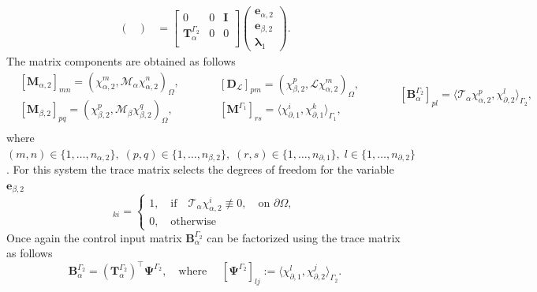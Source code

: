 \documentclass[11pt,a4paper]{article}
\newcommand{\innerproduct}[3][\Omega]{(#2, #3)_{#1}}
\newcommand{\boundary}[3][\partial\Omega]{\langle #2, #3\rangle_{#1}}
\begin{document}
{\begin{equation}
\begin{aligned}
\begin{pmatrix}
        \end{pmatrix} &= 
        \begin{bmatrix}
            0 & 0 & \mathbf{I} \\
            \mathbf{T}_\alpha^{\Gamma_2} & 0 & 0 \\
        \end{bmatrix}
        \begin{pmatrix}
            \mathbf{e}_{\alpha, 2} \\
            \mathbf{e}_{\beta, 2} \\
            \bm{\lambda}_1
        \end{pmatrix}.
\end{aligned}
\label{eq:systemL}
\end{equation}
The matrix components are obtained as follows
\begin{equation}
\begin{aligned}
&[\mathbf{M}_{\alpha, 2}]_{mn} = \innerproduct{\chi_{\alpha, 2}^m}{\mathcal{M}_\alpha \chi_{\alpha, 2}^n}, \\
&[\mathbf{M}_{\beta, 2}]_{pq} = \innerproduct{\chi_{\beta, 2}^p}{\mathcal{M}_\beta \chi_{\beta, 2}^q}, \\
\end{aligned}\qquad
\begin{aligned}
&[\mathbf{D}_\mathcal{L}]_{pm} = \innerproduct{\chi_{\beta, 2}^p}{\mathcal{L}\chi_{\alpha, 2}^m}, \\
&[\mathbf{M}^{\Gamma_1}]_{rs} = \boundary[\Gamma_1]{\chi_{\partial, 1}^i}{\chi_{\partial, 1}^k}, \\
\end{aligned}
\qquad
\begin{aligned}
&[\mathbf{B}_\alpha^{\Gamma_2}]_{pl} = \boundary[\Gamma_2]{\mathcal{T}_{\alpha}\chi_{\alpha, 2}^p}{\chi_{\partial, 2}^l}, \\
{}
\end{aligned}
\label{eq:Operational-matrices_2}
\end{equation}
where $(m,n) \in \{1, \dots, n_{\alpha, 2}\}, \; (p,q) \in\{1, \dots, n_{\beta, 2}\}, \; (r,s) \in \{1,\dots, n_{\partial, 1}\}, \; l \in \{1,\dots, n_{\partial, 2}\}$. For this system the trace matrix selects the degrees of freedom for the variable $\mathbf{e}_{\beta, 2}$
\begin{equation}
        [\mathbf{T}_{\alpha}^{\Gamma_i}]_{ki} = \begin{cases}
            1,  \quad \text{if} \quad \mathcal{T}_\alpha \chi_{\alpha, 2}^i \not\equiv 0, \quad \text{on } \partial\Omega,\\
            0,  \quad \text{otherwise}
        \end{cases} 
\end{equation}
Once again the control input matrix $\mathbf{B}_\alpha^{\Gamma_2}$ can be factorized using the trace matrix as follows
$$
\mathbf{B}_\alpha^{\Gamma_2} = (\mathbf{T}_\alpha^{\Gamma_2})^\top\bm{\Psi}^{\Gamma_2}, \quad \text{where } \quad [\bm{\Psi}^{\Gamma_2}]_{lj}:= \boundary[\Gamma_2]{\chi_{\partial, 1}^l}{\chi_{\partial, 2}^j}.
$$
} 
\end{document}
